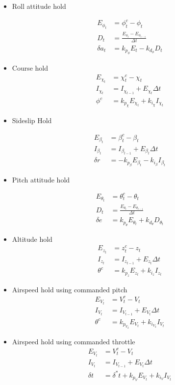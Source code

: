 \documentclass{article}
\begin{document}
\begin{itemize}
\item Roll attitude hold 

\begin{align*}
  E_{\phi_t} &= \phi^c_t - \phi_t\\
  D_t &= \frac{E_{\phi_t} - E_{\phi_{t-1}}}{\Delta t} \\
  \delta a_t &= k_{p_\phi}E_t  - k_{d_\phi}D_t
\end{align*} 

\item Course hold 
\begin{align*}
  E_{\chi_t} &= \chi^c_t - \chi_t\\
  I_{\chi_t} &= I_{\chi_{t-1}} + E_{\chi_t}\Delta t\\
  \phi^c &= k_{p_\chi}E_{\chi_t} + k_{i_\chi}I_{\chi_t}
\end{align*} 

\item Sideslip Hold 

\begin{align*} 
  E_{\beta_t} &= \beta^c_t - \beta_t\\
  I_{\beta_t} &= I_{\beta_{t-1}} + E_{\beta_t}\Delta t\\
  \delta r &= -k_{p_\beta}E_{\beta_t} - k_{i_\beta} I_{\beta_t}
\end{align*}

\item Pitch attitude hold 

\begin{align*}
  E_{\theta_t} &= \theta^c_t - \theta_t\\
  D_t &= \frac{E_{\theta_t} - E_{\theta_{t-1}}}{\Delta t} \\
  \delta e &= k_{p_\theta}E_{\theta_t} + k_{d_\theta}D_{\theta_t}
\end{align*} 

\item Altitude hold 
\begin{align*}
  E_{z_t} &= z^c_t - z_t\\
  I_{z_t} &= I_{z_{t-1}} + E_{z_t}\Delta t\\
  \theta^c &= k_{p_z}E_{z_t} + k_{i_z}I_{z_t}
\end{align*} 

\item Airspeed hold using commanded pitch 
\begin{align*}
  E_{V_t} &= V^c_t - V_t\\
  I_{V_t} &= I_{V_{t-1}} + E_{V_t}\Delta t\\
  \theta^c &= k_{p_{V_2}}E_{V_t} + k_{i_{V_2}}I_{V_t}
\end{align*} 

\item Airspeed hold using commanded throttle
\begin{align*}
  E_{V_t} &= V^c_t - V_t\\
  I_{V_t} &= I_{V_{t-1}} + E_{V_t}\Delta t\\
  \delta t &= \delta^* t + k_{p_V}E_{V_t} + k_{i_V}I_{V_t}
\end{align*} 
\end{itemize}
\end{document}
